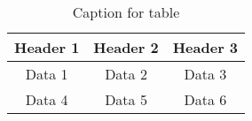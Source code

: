 \documentclass{article}
\begin{document}
\begin{table}[ht]
\centering
\begin{tabular}{c|c|c}
\hline
Header 1 & Header 2 & Header 3 \\
\hline
Data 1 & Data 2 & Data 3 \\
Data 4 & Data 5 & Data 6 \\
\hline
\end{tabular}
\caption{Caption for table}
\label{{table:your_label_here}}
\end{table}
\end{document}
